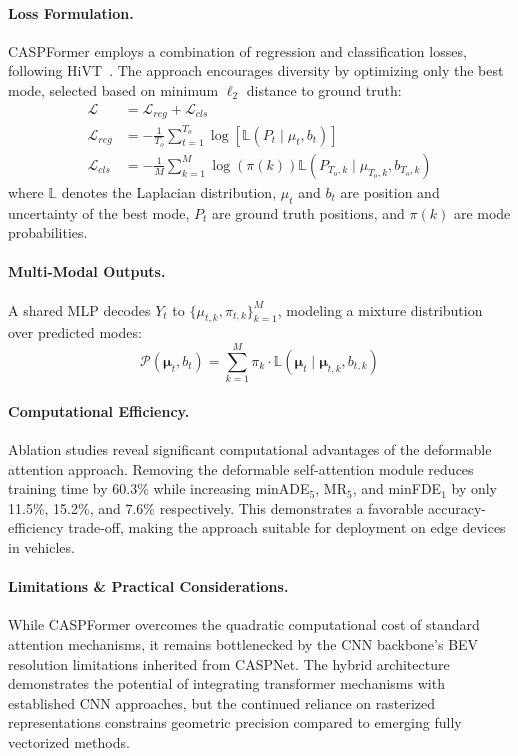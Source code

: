 \paragraph{Loss Formulation.} CASPFormer employs a combination of regression and classification losses, following HiVT~\cite{zhou2022hivt}. The approach encourages diversity by optimizing only the best mode, selected based on minimum $\ell_2$ distance to ground truth:
\begin{align}
\mathcal{L} &= \mathcal{L}_{reg} + \mathcal{L}_{cls}\\
\mathcal{L}_{reg} &= -\frac{1}{T_o} \sum_{t=1}^{T_o} \log[\mathbb{L}(P_t \mid \mu_t, b_t)]\\
\mathcal{L}_{cls} &= -\frac{1}{M} \sum_{k=1}^{M} \log(\pi(k)) \mathbb{L}(P_{T_o,k} \mid \mu_{T_o,k}, b_{T_o,k})
\end{align}
where $\mathbb{L}$ denotes the Laplacian distribution, $\mu_t$ and $b_t$ are position and uncertainty of the best mode, $P_t$ are ground truth positions, and $\pi(k)$ are mode probabilities.

\paragraph{Multi-Modal Outputs.} A shared MLP decodes $Y_t$ to $\{\mu_{t,k},\pi_{t,k}\}_{k=1}^M$, modeling a mixture distribution over predicted modes:
\[
\mathcal{P}(\boldsymbol{\mu}_t, b_t) = \sum_{k=1}^{M} \pi_k \cdot \mathbb{L}(\boldsymbol{\mu}_t \mid \boldsymbol{\mu}_{t,k}, b_{t,k})
\]

\paragraph{Computational Efficiency.} Ablation studies reveal significant computational advantages of the deformable attention approach. Removing the deformable self-attention module reduces training time by 60.3\% while increasing minADE$_5$, MR$_5$, and minFDE$_1$ by only 11.5\%, 15.2\%, and 7.6\% respectively. This demonstrates a favorable accuracy-efficiency trade-off, making the approach suitable for deployment on edge devices in vehicles.

\paragraph{Limitations \& Practical Considerations.} While CASPFormer overcomes the quadratic computational cost of standard attention mechanisms, it remains bottlenecked by the CNN backbone's BEV resolution limitations inherited from CASPNet. The hybrid architecture demonstrates the potential of integrating transformer mechanisms with established CNN approaches, but the continued reliance on rasterized representations constrains geometric precision compared to emerging fully vectorized methods.

